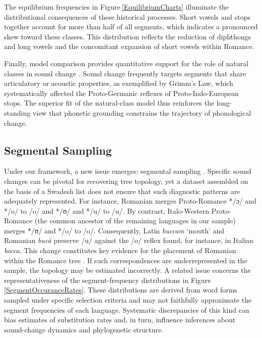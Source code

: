 \documentclass[numsec,webpdf,modern,large,namedate]{oup-authoring-template}
\begin{document}
The equilibrium frequencies in Figure$~$\ref{EquilibriumCharts} illuminate the distributional consequences of these historical processes. Short vowels and stops together account for more than half of all segments, which indicates a pronounced skew toward these classes. This distribution reflects the reduction of diphthongs and long vowels and the concomitant expansion of short vowels within Romance. 

Finally, model comparison provides quantitative support for the role of natural classes in sound change \citep[p. 201]{King1969}. Sound change frequently targets segments that share articulatory or acoustic properties, as exemplified by Grimm’s Law, which systematically affected the Proto-Germanic reflexes of Proto-Indo-European stops. The superior fit of the natural-class model thus reinforces the long-standing view that phonetic grounding constrains the trajectory of phonological change. 

\subsection{Segmental Sampling}
\label{PaperSections_SegmentalSampling}
Under our framework, a new issue emerges: segmental sampling \citep{Dockum2019}. Specific sound changes can be pivotal for recovering tree topology, yet a dataset assembled on the basis of a Swadesh list does not ensure that such diagnostic patterns are adequately represented. For instance, Romanian merges Proto-Romance */ɔ/ and */o/ to /o/ and */ʊ/ and */u/ to /u/. By contrast, Italo-Western Proto-Romance (the common ancestor of the remaining languages in our sample) merges */ʊ/ and */o/ to /o/. Consequently, Latin \textit{buccam} ‘mouth’ and Romanian \textit{bucă} preserve /u/ against the /o/ reflex found, for instance, in Italian \textit{bocca}. This change constitutes key evidence for the placement of Romanian within the Romance tree \citep{Janson1979,Herman2000}. If such correspondences are underrepresented in the sample, the topology may be estimated incorrectly. A related issue concerns the representativeness of the segment-frequency distributions in Figure$~$\ref{SegmentOccuranceRates}. These distributions are derived from word forms sampled under specific selection criteria and may not faithfully approximate the segment frequencies of each language. Systematic discrepancies of this kind can bias estimates of substitution rates and, in turn, influence inferences about sound-change dynamics and phylogenetic structure. 
\end{document}
